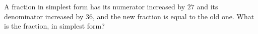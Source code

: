 A fraction in simplest form has its numerator increased by $27$ and its denominator increased by $36$, and the new fraction is equal to the old one. What is the fraction, in simplest form?
